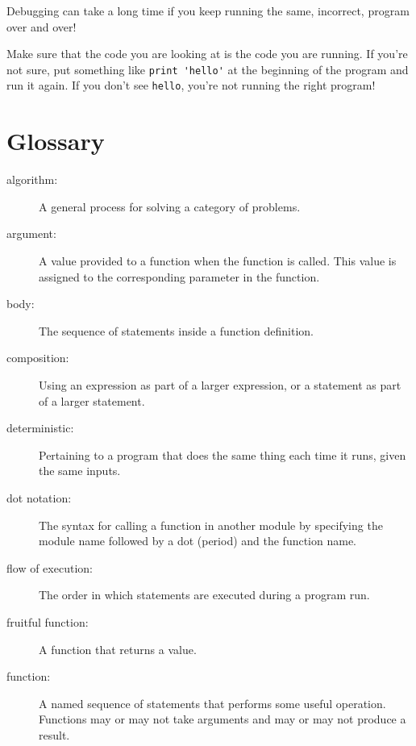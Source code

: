 Debugging can take a long time if you keep running the same,
incorrect, program over and over!

Make sure that the code you are looking at is the code you are running.
If you're not sure, put something like \verb"print 'hello'" at the
beginning of the program and run it again.  If you don't see
\verb"hello", you're not running the right program!




\section{Glossary}

\begin{description}

\item[algorithm:]  A general process for solving a category of
problems.

\item[argument:]  A value provided to a function when the function is called.
This value is assigned to the corresponding parameter in the function.

\item[body:] The sequence of statements inside a function definition.

\item[composition:] Using an expression as part of a larger expression,
or a statement as part of a larger statement.

\item[deterministic:] Pertaining to a program that does the same
thing each time it runs, given the same inputs.

\item[dot notation:]  The syntax for calling a function in another
module by specifying the module name followed by a dot (period) and
the function name.

\item[flow of execution:]  The order in which statements are executed during
a program run.

\item[fruitful function:] A function that returns a value.

\item[function:] A named sequence of statements that performs some
useful operation.  Functions may or may not take arguments and may or
may not produce a result.


\end{description}
